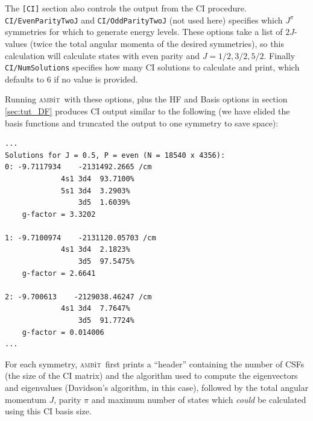\documentclass{report}
\newcommand{\ambit}{\textsc{amb}{\footnotesize i}\textsc{t}}
\begin{document}
The \texttt{[CI]} section also controls the output from the CI procedure. \texttt{CI/EvenParityTwoJ} and
\texttt{CI/OddParityTwoJ} (not used here) specifies which $J^{\pi}$ symmetries for which to generate 
energy levels. These options take a list of $2J$-values (twice the total angular momenta of the desired
symmetries), so this calculation will calculate states with even parity and $J = 1/2, 3/2, 5/2$. Finally
\texttt{CI/NumSolutions} specifies how many CI solutions to calculate and print, which defaults to 6 if
no value is provided.

Running \ambit\  with these options, plus the HF and Basis options in section \ref{sec:tut_DF} produces
CI output similar to the following (we have elided the basis functions and truncated the output to one
symmetry to save space):

\begin{verbatim}
...
Solutions for J = 0.5, P = even (N = 18540 x 4356):                            
0: -9.7117934    -2131492.2665 /cm                                             
             4s1 3d4  93.7100%                                                 
             5s1 3d4  3.2903%                                                  
                 3d5  1.6039%                                                  
    g-factor = 3.3202                                                          
                                                                               
1: -9.7100974    -2131120.05703 /cm                                            
             4s1 3d4  2.1823%                                                  
                 3d5  97.5475%                                                 
    g-factor = 2.6641                                                          
                                                                               
2: -9.700613    -2129038.46247 /cm                                             
             4s1 3d4  7.7647%                                                  
                 3d5  91.7724%                                                 
    g-factor = 0.014006 
...
\end{verbatim}

For each symmetry, \ambit\  first prints a ``header'' containing the number of CSFs 
(the size of the CI matrix) and the algorithm used to compute the eigenvectors and eigenvalues 
(Davidson's algorithm, in this case), followed by the total angular momentum $J$, parity $\pi$ and 
maximum number of states which \textit{could} be calculated using this CI basis size.
\end{document}
